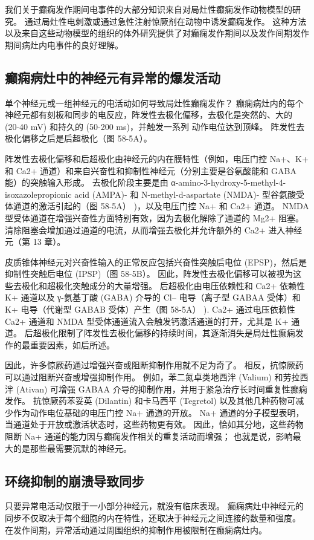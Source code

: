 我们关于癫痫发作期间电事件的大部分知识来自对局灶性癫痫发作动物模型的研究。 通过局灶性电刺激或通过急性注射惊厥剂在动物中诱发癫痫发作。 这种方法以及来自这些动物模型的组织的体外研究提供了对癫痫发作期间以及发作间期发作期间病灶内电事件的良好理解。

\subsection{癫痫病灶中的神经元有异常的爆发活动}

单个神经元或一组神经元的电活动如何导致局灶性癫痫发作？ 癫痫病灶内的每个神经元都有刻板和同步的电反应，阵发性去极化偏移，去极化是突然的、大的 (20-40 mV) 和持久的 (50-200 ms)，并触发一系列 动作电位达到顶峰。 阵发性去极化偏移之后是后超极化（图 58-5A）。

阵发性去极化偏移和后超极化由神经元的内在膜特性（例如，电压门控 Na+、K+ 和 Ca2+ 通道）和来自兴奋性和抑制性神经元（分别主要是谷氨酸能和 GABA 能）的突触输入形成。 去极化阶段主要是由 α-amino-3-hydroxy-5-methyl-4-isoxazolepropionic acid (AMPA)- 和 N-methyl-d-aspartate (NMDA)- 型谷氨酸受体通道的激活引起的（图 58-5A） )，以及电压门控 Na+ 和 Ca2+ 通道。 NMDA 型受体通道在增强兴奋性方面特别有效，因为去极化解除了通道的 Mg2+ 阻塞。 清除阻塞会增加通过通道的电流，从而增强去极化并允许额外的 Ca2+ 进入神经元（第 13 章）。

皮质锥体神经元对兴奋性输入的正常反应包括兴奋性突触后电位 (EPSP)，然后是抑制性突触后电位 (IPSP)（图 58-5B）。 因此，阵发性去极化偏移可以被视为这些去极化和超极化突触成分的大量增强。 后超极化由电压依赖性和 Ca2+ 依赖性 K+ 通道以及 γ-氨基丁酸 (GABA) 介导的 Cl– 电导（离子型 GABAA 受体）和 K+ 电导（代谢型 GABAB 受体）产生（图 58-5A） ). Ca2+ 通过电压依赖性 Ca2+ 通道和 NMDA 型受体通道流入会触发钙激活通道的打开，尤其是 K+ 通道。 后超极化限制了阵发性去极化偏移的持续时间，其逐渐消失是局灶性癫痫发作的最重要因素，如后所述。

因此，许多惊厥药通过增强兴奋或阻断抑制作用就不足为奇了。 相反，抗惊厥药可以通过阻断兴奋或增强抑制作用。 例如，苯二氮卓类地西泮 (Valium) 和劳拉西泮 (Ativan) 可增强 GABAA 介导的抑制作用，并用于紧急治疗长时间重复性癫痫发作。 抗惊厥药苯妥英 (Dilantin) 和卡马西平 (Tegretol) 以及其他几种药物可减少作为动作电位基础的电压门控 Na+ 通道的开放。 Na+ 通道的分子模型表明，当通道处于开放或激活状态时，这些药物更有效。 因此，恰如其分地，这些药物阻断 Na+ 通道的能力因与癫痫发作相关的重复活动而增强； 也就是说，影响最大的是那些最需要沉默的神经元。

\subsection{环绕抑制的崩溃导致同步}
只要异常电活动仅限于一小部分神经元，就没有临床表现。 癫痫病灶中神经元的同步不仅取决于每个细胞的内在特性，还取决于神经元之间连接的数量和强度。 在发作间期，异常活动通过周围组织的抑制作用被限制在癫痫病灶内。

